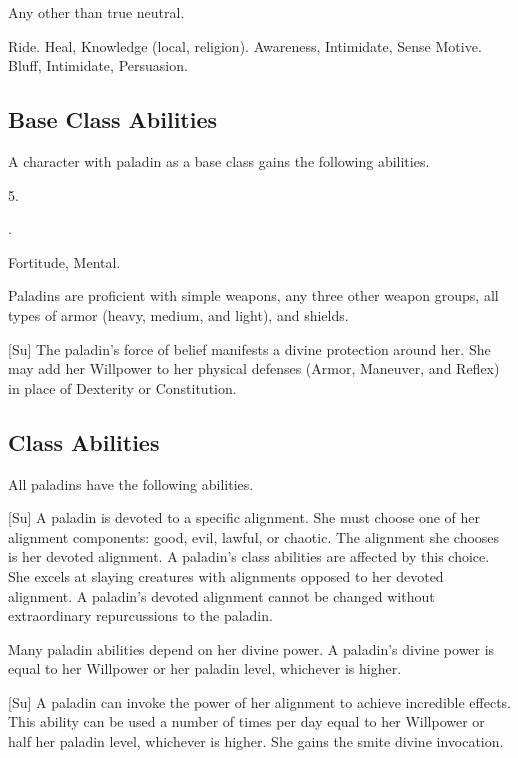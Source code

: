      Any other than true neutral.

     Ride.
     Heal, Knowledge (local, religion).
     Awareness, Intimidate, Sense Motive.
     Bluff, Intimidate, Persuasion.

    \subsection{Base Class Abilities}
        A character with paladin as a base class gains the following abilities.

         5.

         .

          Fortitude,  Mental.

        Paladins are proficient with simple weapons, any three other weapon groups, all types of armor (heavy, medium, and light), and shields.

        [Su]
        The paladin's force of belief manifests a divine protection around her.
        She may add her Willpower to her physical defenses (Armor, Maneuver, and Reflex) in place of Dexterity or Constitution.

    \subsection{Class Abilities}
        All paladins have the following abilities.

        [Su]
        A paladin is devoted to a specific alignment.
        She must choose one of her alignment components: good, evil, lawful, or chaotic.
        The alignment she chooses is her devoted alignment.
        A paladin's class abilities are affected by this choice.
        She excels at slaying creatures with alignments opposed to her devoted alignment.
        A paladin's devoted alignment cannot be changed without extraordinary repurcussions to the paladin.

        Many paladin abilities depend on her divine power.
        A paladin's divine power is equal to her Willpower or her paladin level, whichever is higher.

        [Su]
        A paladin can invoke the power of her alignment to achieve incredible effects.
        This ability can be used a number of times per day equal to her Willpower or half her paladin level, whichever is higher.
        She gains the smite divine invocation.

